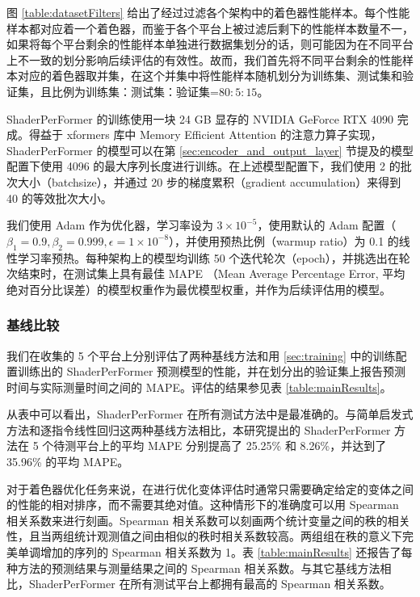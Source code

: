 \label{sec:training}

图 \ref{table:datasetFilters} 给出了经过过滤各个架构中的着色器性能样本。每个性能样本都对应着一个着色器，而鉴于各个平台上被过滤后剩下的性能样本数量不一，如果将每个平台剩余的性能样本单独进行数据集划分的话，则可能因为在不同平台上不一致的划分影响后续评估的有效性。故而，我们首先将不同平台剩余的性能样本对应的着色器取并集，在这个并集中将性能样本随机划分为训练集、测试集和验证集，且比例为训练集：测试集：验证集=$80:5:15$。

ShaderPerFormer 的训练使用一块 24 GB 显存的 NVIDIA GeForce RTX 4090 完成。得益于 xformers \cite{xFormers2022}库中 Memory Efficient Attention 的注意力算子实现\cite{rabe2022selfattention}，ShaderPerFormer 的模型可以在第 \ref{sec:encoder_and_output_layer} 节提及的模型配置下使用 4096 的最大序列长度进行训练。在上述模型配置下，我们使用 2 的批次大小（batchsize），并通过 20 步的梯度累积（gradient accumulation）来得到 40 的等效批次大小。

我们使用 Adam \cite{Kingma2014AdamAM} 作为优化器，学习率设为 $3 \times 10^{-5}$，使用默认的 Adam 配置（$\beta_1=0.9, \beta_2=0.999, \epsilon=1 \times 10^{-8}$），并使用预热比例（warmup ratio）为 0.1 的线性学习率预热。每种架构上的模型均训练 50 个迭代轮次（epoch），并挑选出在轮次结束时，在测试集上具有最佳 MAPE （Mean Average Percentage Error, 平均绝对百分比误差）的模型权重作为最优模型权重，并作为后续评估用的模型。

\subsubsection{基线比较}

我们在收集的 5 个平台上分别评估了两种基线方法和用 \ref{sec:training} 中的训练配置训练出的 ShaderPerFormer 预测模型的性能，并在划分出的验证集上报告预测时间与实际测量时间之间的 MAPE。评估的结果参见表 \ref{table:mainResults}。

从表中可以看出，ShaderPerFormer 在所有测试方法中是最准确的。与简单启发式方法和逐指令线性回归这两种基线方法相比，本研究提出的 ShaderPerFormer 方法在 5 个待测平台上的平均 MAPE 分别提高了 25.25\% 和 8.26\%，并达到了 35.96\% 的平均 MAPE。

对于着色器优化任务来说，在进行优化变体评估时通常只需要确定给定的变体之间的性能的相对排序，而不需要其绝对值。这种情形下的准确度可以用 Spearman 相关系数来进行刻画。Spearman 相关系数可以刻画两个统计变量之间的秩的相关性，且当两组统计观测值之间由相似的秩时相关系数较高。两组组在秩的意义下完美单调增加的序列的 Spearman 相关系数为 1。表 \ref{table:mainResults} 还报告了每种方法的预测结果与测量结果之间的 Spearman 相关系数。与其它基线方法相比，ShaderPerFormer 在所有测试平台上都拥有最高的 Spearman 相关系数。

